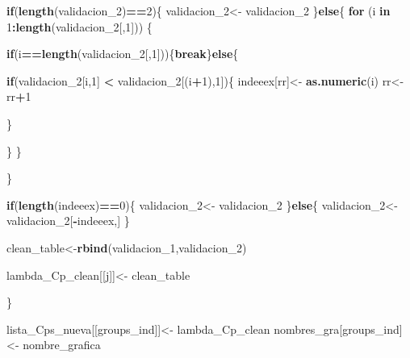 \documentclass[]{article}
\newenvironment{Shaded}{\begin{snugshade}}{\end{snugshade}}
\newcommand{\KeywordTok}[1]{\textcolor[rgb]{0.13,0.29,0.53}{\textbf{#1}}}
\newcommand{\DecValTok}[1]{\textcolor[rgb]{0.00,0.00,0.81}{#1}}
\newcommand{\StringTok}[1]{\textcolor[rgb]{0.31,0.60,0.02}{#1}}
\newcommand{\ControlFlowTok}[1]{\textcolor[rgb]{0.13,0.29,0.53}{\textbf{#1}}}
\newcommand{\OperatorTok}[1]{\textcolor[rgb]{0.81,0.36,0.00}{\textbf{#1}}}
\newcommand{\NormalTok}[1]{#1}
\begin{document}
\begin{Shaded}
\begin{Highlighting}[]
{{{{{{{{{{{{      \ControlFlowTok{if}\NormalTok{(}\KeywordTok{length}\NormalTok{(validacion_}\DecValTok{2}\NormalTok{)}\OperatorTok{==}\DecValTok{2}\NormalTok{)\{}
\NormalTok{        validacion_}\DecValTok{2}\NormalTok{<-}\StringTok{ }\NormalTok{validacion_}\DecValTok{2}
\NormalTok{      \}}\ControlFlowTok{else}\NormalTok{\{}
        \ControlFlowTok{for}\NormalTok{ (i }\ControlFlowTok{in} \DecValTok{1}\OperatorTok{:}\KeywordTok{length}\NormalTok{(validacion_}\DecValTok{2}\NormalTok{[,}\DecValTok{1}\NormalTok{])) \{}
          
          
          \ControlFlowTok{if}\NormalTok{(i}\OperatorTok{==}\KeywordTok{length}\NormalTok{(validacion_}\DecValTok{2}\NormalTok{[,}\DecValTok{1}\NormalTok{]))\{}\ControlFlowTok{break}\NormalTok{\}}\ControlFlowTok{else}\NormalTok{\{}
            
            \ControlFlowTok{if}\NormalTok{(validacion_}\DecValTok{2}\NormalTok{[i,}\DecValTok{1}\NormalTok{] }\OperatorTok{<}\StringTok{ }\NormalTok{validacion_}\DecValTok{2}\NormalTok{[(i}\OperatorTok{+}\DecValTok{1}\NormalTok{),}\DecValTok{1}\NormalTok{])\{}
\NormalTok{              indeeex[rr]<-}\StringTok{ }\KeywordTok{as.numeric}\NormalTok{(i) }
\NormalTok{              rr<-rr}\OperatorTok{+}\DecValTok{1}
              
              
\NormalTok{            \}}
            
\NormalTok{          \}}
\NormalTok{        \}}
        
\NormalTok{      \}}
      
      
      \ControlFlowTok{if}\NormalTok{(}\KeywordTok{length}\NormalTok{(indeeex)}\OperatorTok{==}\DecValTok{0}\NormalTok{)\{}
\NormalTok{        validacion_}\DecValTok{2}\NormalTok{<-}\StringTok{ }\NormalTok{validacion_}\DecValTok{2}
\NormalTok{      \}}\ControlFlowTok{else}\NormalTok{\{}
\NormalTok{        validacion_}\DecValTok{2}\NormalTok{<-validacion_}\DecValTok{2}\NormalTok{[}\OperatorTok{-}\NormalTok{indeeex,]}
\NormalTok{      \}}
      
\NormalTok{      clean_table<-}\KeywordTok{rbind}\NormalTok{(validacion_}\DecValTok{1}\NormalTok{,validacion_}\DecValTok{2}\NormalTok{)}
      
      
\NormalTok{      lambda_Cp_clean[[j]]<-}\StringTok{ }\NormalTok{clean_table}
      
\NormalTok{    \}}
    
\NormalTok{    lista_Cps_nueva[[groups_ind]]<-}\StringTok{ }\NormalTok{lambda_Cp_clean}
\NormalTok{    nombres_gra[groups_ind]<-}\StringTok{ }\NormalTok{nombre_grafica}
    
}}}}}}}}}}}}
\end{Highlighting}
\end{Shaded}
\end{document}
